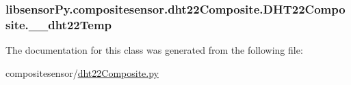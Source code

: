 \subsubsection[{\+\_\+\+\_\+dht22\+Temp}]{\setlength{\rightskip}{0pt plus 5cm}libsensor\+Py.\+compositesensor.\+dht22\+Composite.\+D\+H\+T22\+Composite.\+\_\+\+\_\+dht22\+Temp\hspace{0.3cm}{\ttfamily [private]}}\label{classlibsensorPy_1_1compositesensor_1_1dht22Composite_1_1DHT22Composite_a026445a9d798d7dab6d2786bbeaa702f}


The documentation for this class was generated from the following file\+:\begin{DoxyCompactItemize}
\item 
compositesensor/\hyperlink{compositesensor_2dht22Composite_8py}{dht22\+Composite.\+py}\end{DoxyCompactItemize}
